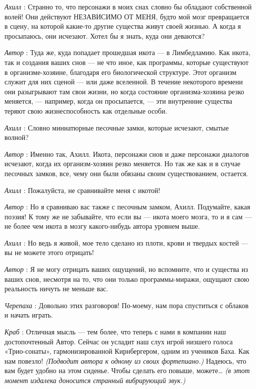 \emph{Ахилл} : Странно то, что персонажи в моих снах словно бы обладают собственной волей! Они действуют НЕЗАВИСИМО ОТ МЕНЯ, будто мой мозг превращается в сцену, на которой какие-то другие существа живут своей жизнью. А когда я просыпаюсь, они исчезают. Хотел бы я знать, куда они деваются?

\emph{Автор} : Туда же, куда попадает прошедшая икота --- в Лимбедламию. Как икота, так и создания ваших снов --- не что иное, как программы, которые существуют в организме-хозяине, благодаря его биологической структуре. Этот организм служит для них сценой --- или даже вселенной. В течение некоторого времени они разыгрывают там свои жизни, но когда состояние организма-хозяина резко меняется, --- например, когда он просыпается, --- эти внутренние существа теряют свою жизнеспособность как отдельные особи.

\emph{Ахилл} : Словно миниатюрные песочные замки, которые исчезают, смытые волной?

\emph{Автор} : Именно так, Ахилл. Икота, персонажи снов и даже персонажи диалогов исчезают, когда их организм-хозяин резко меняется. Но так же как и в случае песочных замков, все, чему они были обязаны своим существованием, остается.

\emph{Ахилл} : Пожалуйста, не сравнивайте меня с икотой!

\emph{Автор} : Но я сравниваю вас также с песочным замком, Ахилл. Подумайте, какая поэзия! К тому же не забывайте, что если вы --- икота моего мозга, то и я сам --- не более чем икота в мозгу какого-нибудь автора уровнем выше.

\emph{Ахилл} : Но ведь я живой, мое тело сделано из плоти, крови и твердых костей --- вы не можете этого отрицать!

\emph{Автор} : Я не могу отрицать ваших ощущений, но вспомните, что и существа из ваших снов, несмотря на то, что они только программы-миражи, ощущают свою реальность ничуть не меньше вас.

\emph{Черепаха} : Довольно этих разговоров! По-моему, нам пора спуститься с облаков и начать играть.

\emph{Краб} : Отличная мысль --- тем более, что теперь с нами в компании наш достопочтенный Автор. Сейчас он усладит наш слух игрой низшего голоса «Трио-сонаты», гармонизированной Кирнбергером, одним из учеников Баха. Как нам повезло! \emph{(Подводит автора к одному из своих фортепиано.)} Надеюсь, что вам будет удобно на этом сиденье. Чтобы сделать его повыше, можете\ldots{} \emph{(в этот момент издалека доносится странный вибрирующий звук.)}

